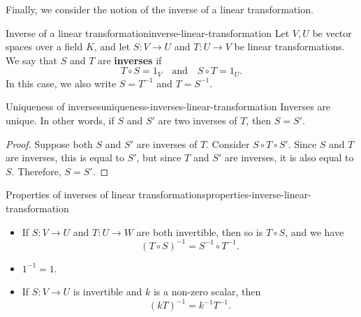 Finally, we consider the notion of the inverse of a linear
transformation.

\begin{definition}{Inverse of a linear transformation}{inverse-linear-transformation}
  Let $V,U$ be vector spaces over a field $K$, and let $S:V\to U$ and
  $T:U\to V$ be linear transformations.  We say that $S$ and $T$ are
  \textbf{inverses}%
   if
  \begin{equation*}
    T\circ S = 1_V
    \quad\mbox{and}\quad
    S\circ T = 1_U.
  \end{equation*}
  In this case, we also write $S=T^{-1}$ and $T=S^{-1}$.  
\end{definition}

\begin{proposition}{Uniqueness of inverses}{uniqueness-inverses-linear-transformation}
  Inverses are unique. In other words, if $S$ and $S'$ are two inverses
  of $T$, then $S=S'$.
\end{proposition}

\begin{proof}
  Suppose both $S$ and $S'$ are inverses of $T$. Consider
  $S\circ T\circ S'$. Since $S$ and $T$ are inverses, this is equal to
  $S'$, but since $T$ and $S'$ are inverses, it is also equal to
  $S$. Therefore, $S=S'$.
\end{proof}

\begin{proposition}{Properties of inverses of linear transformations}{properties-inverse-linear-transformation}
  \begin{itemize}
  \item If $S:V\to U$ and $T:U\to W$ are both invertible, then so is
    $T\circ S$, and we have
    \begin{equation*}
      (T\circ S)^{-1} = S^{-1}\circ T^{-1}.
    \end{equation*}
  \item $1^{-1} = 1$.
  \item If $S:V\to U$ is invertible and $k$ is a non-zero scalar, then
    \begin{equation*}
      (kT)^{-1} = k^{-1}T^{-1}.
    \end{equation*}
  \end{itemize}
\end{proposition}
